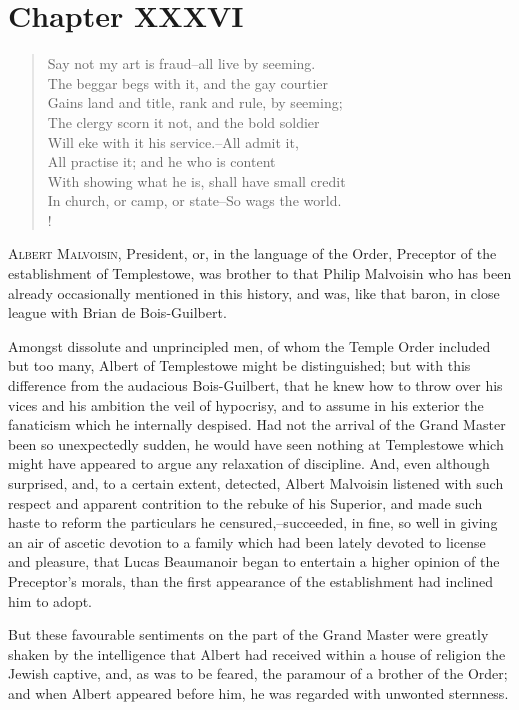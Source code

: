 \chapter{Chapter XXXVI}

\begin{verse}
Say not my art is fraud--all live by seeming.\\
The beggar begs with it, and the gay courtier\\
Gains land and title, rank and rule, by seeming;\\
The clergy scorn it not, and the bold soldier\\
Will eke with it his service.--All admit it,\\
All practise it; and he who is content\\
With showing what he is, shall have small credit\\
In church, or camp, or state--So wags the world.\\!
\end{verse}

\lettrine{A}{lbert Malvoisin}, President, or, in the language of the
Order, Preceptor
of the establishment of Templestowe, was brother to that Philip
Malvoisin who has been already occasionally mentioned in this history,
and was, like that baron, in close league with Brian de Bois-Guilbert.

Amongst dissolute and unprincipled men, of whom the Temple Order
included but too many, Albert of Templestowe might be distinguished; but
with this difference from the audacious Bois-Guilbert, that he knew how
to throw over his vices and his ambition the veil of hypocrisy, and to
assume in his exterior the fanaticism which he internally despised. Had
not the arrival of the Grand Master been so unexpectedly sudden, he
would have seen nothing at Templestowe which might have appeared to
argue any relaxation of discipline. And, even although surprised, and,
to a certain extent, detected, Albert Malvoisin listened with such
respect and apparent contrition to the rebuke of his Superior, and made
such haste to reform the particulars he censured,--succeeded, in fine,
so well in giving an air of ascetic devotion to a family which had been
lately devoted to license and pleasure, that Lucas Beaumanoir began to
entertain a higher opinion of the Preceptor's morals, than the first
appearance of the establishment had inclined him to adopt.

But these favourable sentiments on the part of the Grand Master were
greatly shaken by the intelligence that Albert had received within a
house of religion the Jewish captive, and, as was to be feared, the
paramour of a brother of the Order; and when Albert appeared before him,
he was regarded with unwonted sternness.

